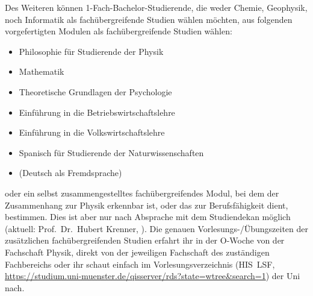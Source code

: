 {\small
Des Weiteren können 1-Fach-Bachelor-Studierende, die weder Chemie, Geophysik, noch Informatik als fachübergreifende Studien wählen möchten, aus folgenden vorgefertigten Modulen als fachübergreifende Studien wählen:
\begin{itemize}[nosep]
	\item Philosophie für Studierende der Physik
	\item Mathematik
	\item Theoretische Grundlagen der Psychologie
	\item Einführung in die Betriebswirtschaftslehre
	\item Einführung in die Volkswirtschaftslehre
	\item Spanisch für Studierende der Naturwissenschaften
	\item (Deutsch als Fremdsprache)
\end{itemize}
oder ein selbst zusammengestelltes fachübergreifendes Modul, bei dem der Zusammenhang zur Physik erkennbar ist, oder das zur Berufsfähigkeit dient, bestimmen.
Dies ist aber nur nach Absprache mit dem Studiendekan möglich (aktuell: Prof.\ Dr.\ Hubert Krenner, ).
Die genauen Vorlesungs-/Übungszeiten der zusätzlichen fachübergreifenden Studien erfahrt ihr in der O-Woche von der Fachschaft Physik, direkt von der jeweiligen Fachschaft des zuständigen Fachbereichs oder ihr schaut einfach im Vorlesungsverzeichnis (HIS~LSF, \url{https://studium.uni-muenster.de/qisserver/rds?state=wtree&search=1}) der Uni nach.
}
